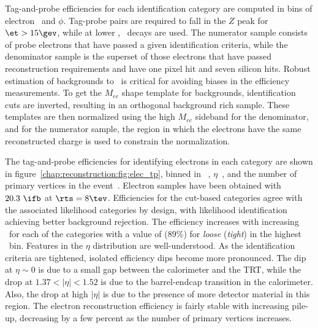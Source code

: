 Tag-and-probe efficiencies for each identification category are
computed in bins of electron \et~and $\phi$. Tag-probe pairs are required to
fall in the $Z$ peak for $\et > 15 \gev$, while at lower \et,
\jpsi~decays are used. The numerator sample consists of probe electrons that
have passed a given identification criteria, while the denominator
sample is the superset of those electrons that have passed
reconstruction requirements and have one pixel hit and seven silicon
hits. Robust estimation of  backgrounds to \Zee~is critical for
avoiding biases in the efficiency measurements. To get the $M_{ee}$
shape template for backgrounds, identification cuts are inverted,
resulting in an orthogonal background rich sample. These templates are
then normalized using the high $M_{ee}$ sideband for the denominator,
and for the numerator sample, the region in which the electrons have
the same reconstructed charge is used to constrain the normalization. 

The tag-and-probe efficiencies for identifying electrons in each category are shown
in figure~\ref{chap:reconstruction:fig:elec_tp}, binned in
\et~,
$\eta$~, and the number of
primary vertices in the
event~. Electron samples
have been obtained with $20.3~\ifb$ at $\rts = 8 \tev$. Efficiencies for
the cut-based categories agree with the associated likelihood
categories by design, with likelihood identification achieving better
background rejection. The efficiency increases with increasing \et~for
each of the categories with a value of  (89\%) for
{\it loose} ({\it tight}) in the highest \et~bin. Features
in the $\eta$ distribution are well-understood. As the identification
criteria are tightened, isolated efficiency dips become more
pronounced. The dip at $\eta \sim 0$ is due to a small gap between the
calorimeter and the TRT, while the drop at $1.37 < |\eta| < 1.52$ is due
to the barrel-endcap transition in the calorimeter. Also, the drop at
high $|\eta|$ is due to the presence of more detector material in this
region. The electron reconstruction efficiency is fairly stable with
increasing pile-up, decreasing by a few percent as the number of
primary vertices increases. 

